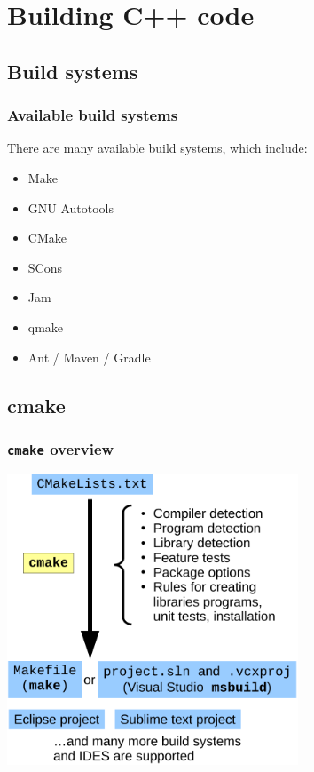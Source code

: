 \documentclass{beamer}
\newcommand{\cmd}[1]{\textbf{\texttt{#1}}}
\begin{document}
\section{Building C++ code}

\subsection{Build systems}

\begin{frame}
  \frametitle{Available build systems}
  There are many available build systems, which include:

  \begin{itemize}
  \item Make
  \item GNU Autotools
  \item CMake
  \item SCons
  \item Jam
  \item qmake
  \item Ant / Maven / Gradle
  \end{itemize}
\end{frame}

\subsection{cmake}

\begin{frame}
  \frametitle{\cmd{cmake} overview}
  \medskip
  \centering
  \includegraphics[width=0.65\textwidth]{cmake-flow}
\end{frame}
\end{document}
